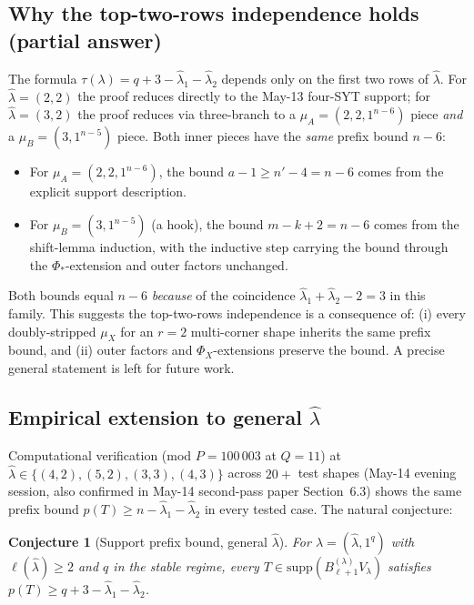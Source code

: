 \documentclass[11pt]{article}
\newtheorem{conjecture}[theorem]{Conjecture}
\theoremstyle{definition}
\newcommand{\Bdec}{B_{\ell+1}^{(\lambda)}}
\newcommand{\hatl}{\widehat\lambda}
\newcommand{\supp}{\mathrm{supp}}
\begin{document}
\subsection{Why the top-two-rows independence holds (partial answer)}

The formula $\tau(\lambda) = q + 3 - \hatl_1 - \hatl_2$ depends only
on the first two rows of $\hatl$.  For $\hatl = (2, 2)$ the proof
reduces directly to the May-13 four-SYT support; for $\hatl = (3, 2)$
the proof reduces via three-branch to a $\mu_A = (2, 2, 1^{n-6})$ piece
\emph{and} a $\mu_B = (3, 1^{n-5})$ piece.  Both inner pieces have
the \emph{same} prefix bound $n - 6$:
\begin{itemize}[topsep=0.3em,itemsep=0.1em]
\item For $\mu_A = (2, 2, 1^{n-6})$, the bound $a - 1 \ge n' - 4 = n - 6$
  comes from the explicit support description.
\item For $\mu_B = (3, 1^{n-5})$ (a hook), the bound $m - k + 2 = n - 6$
  comes from the shift-lemma induction, with the inductive step
  carrying the bound through the $\Phi_*$-extension and outer factors
  unchanged.
\end{itemize}
Both bounds equal $n - 6$ \emph{because} of the coincidence
$\hatl_1 + \hatl_2 - 2 = 3$ in this family.  This suggests the
top-two-rows independence is a consequence of: (i) every doubly-stripped
$\mu_X$ for an $r = 2$ multi-corner shape inherits the same
prefix bound, and (ii) outer factors and $\Phi_X$-extensions preserve
the bound.  A precise general statement is left for future work.

\subsection{Empirical extension to general $\hatl$}

Computational verification (mod $P = 100\,003$ at $Q = 11$) at
$\hatl \in \{(4, 2), (5, 2), (3, 3), (4, 3)\}$ across $20+$ test
shapes (May-14 evening session, also confirmed in May-14 second-pass
paper Section~6.3) shows the same prefix bound $p(T) \ge n - \hatl_1
- \hatl_2$ in every tested case.  The natural conjecture:

\begin{conjecture}[Support prefix bound, general $\hatl$]\label{conj:general-prefix}
For $\lambda = (\hatl, 1^q)$ with $\ell(\hatl) \ge 2$ and $q$ in the
stable regime, every $T \in \supp(\Bdec V_\lambda)$ satisfies
$p(T) \ge q + 3 - \hatl_1 - \hatl_2$.
\end{conjecture}
\end{document}
